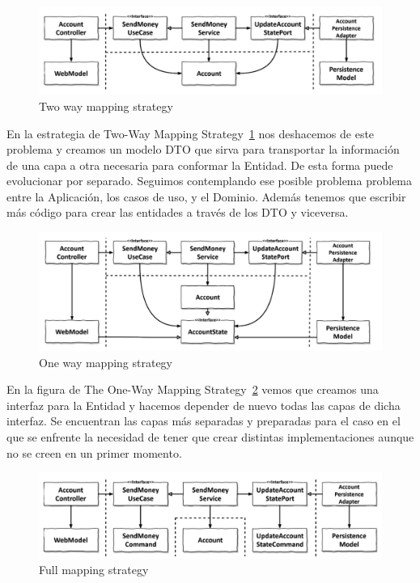 \begin{figure}[H]
    \centering
    \includegraphics[height=0.1\textheight]{./part/Ejecucion/Seguimiento/CreateTaskUseCase/img/twowaymapping}
    \caption{Two way mapping strategy~\cite{TomHombergs2019GYHD}}\label{fig:twowaymapping}
\end{figure}

En la estrategia de Two-Way Mapping Strategy~\cref{fig:twowaymapping} nos deshacemos de este problema y creamos un modelo DTO que sirva para transportar la información de una capa a otra necesaria para conformar la Entidad. De esta forma puede evolucionar por separado. Seguimos contemplando ese posible problema problema entre la Aplicación, los casos de uso, y el Dominio. Además tenemos que escribir más código para crear las entidades a través de los DTO y viceversa.

\begin{figure}[H]
    \centering
    \includegraphics[height=0.1\textheight]{./part/Ejecucion/Seguimiento/CreateTaskUseCase/img/onWaymapping}
    \caption{One way mapping strategy~\cite{TomHombergs2019GYHD}}\label{fig:onWaymapping}
\end{figure}

En la figura de The One-Way Mapping Strategy~\cref{fig:onWaymapping} vemos que creamos una interfaz para la Entidad y hacemos depender de nuevo todas las capas de dicha interfaz. Se encuentran las capas más separadas y preparadas para el caso en el que se enfrente la necesidad de tener que crear distintas implementaciones aunque no se creen en un primer momento.

\begin{figure}[H]
    \centering
    \includegraphics[height=0.1\textheight]{./part/Ejecucion/Seguimiento/CreateTaskUseCase/img/fullmapping}
    \caption{Full mapping strategy~\cite{TomHombergs2019GYHD}}\label{fig:fullmapping}
\end{figure}


